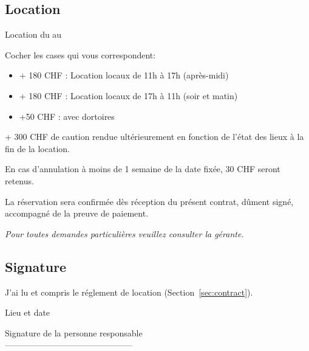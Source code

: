 \documentclass[a4paper,12pt]{extarticle}
\begin{document}
\subsection*{Location}

Location du  au 

Cocher les cases qui vous correspondent:

\begin{itemize}
    \item[]  + 180 CHF : Location locaux de 11h à 17h (après-midi)
    \item[]  + 180 CHF : Location locaux de 17h à 11h (soir et matin)
    \item[]  +50 CHF : avec dortoires
\end{itemize}

+ 300 CHF de caution rendue ultérieurement en fonction de l'état des lieux à la fin de la location.

En cas d'annulation à moins de 1 semaine de la date fixée, 30 CHF seront retenus.

La réservation sera confirmée dès réception du présent contrat, dûment signé, accompagné de la preuve de paiement.

\textit{Pour toutes demandes particulières veuillez consulter la gérante.}

\subsection*{Signature}

 J'ai lu et compris le réglement de location (Section~\ref{sec:contract}).


Lieu et date  

Signature de la personne responsable\\[1.5cm]
---------------------------------------------
\end{document}

